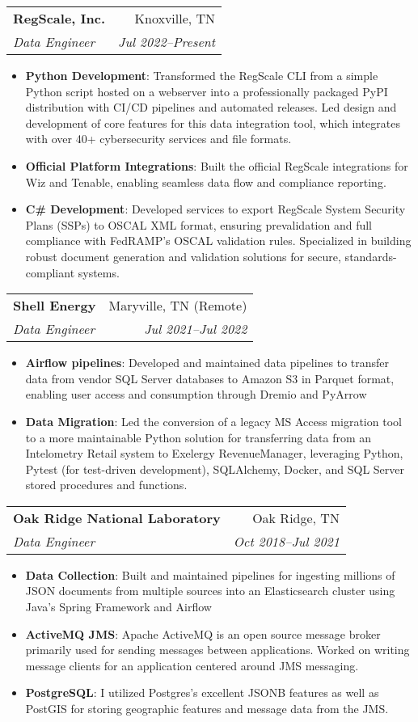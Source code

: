 \documentclass[letterpaper,11pt]{article}
\makeatletter
\newcommand{\resumeItem}[2]{
  \item\small{
    \textbf{#1}{: #2 \vspace{-2pt}}
  }
}
\newcommand{\resumeSubheading}[4]{
  \vspace{-1pt}\item
    \begin{tabular*}{0.97\textwidth}[t]{l@{\extracolsep{\fill}}r}
      \textbf{#1} & #2 \\
      \textit{\small#3} & \textit{\small #4} \\
    \end{tabular*}\vspace{-5pt}
}
\newcommand{\resumeItemListStart}{\begin{itemize}}
\newcommand{\resumeItemListEnd}{\end{itemize}\vspace{-5pt}}
\makeatother
\begin{document}
\resumeSubheading
	{RegScale, Inc.}{Knoxville, TN}
	{Data Engineer}{Jul 2022--Present}
	\resumeItemListStart
	\resumeItem{Python Development}
  {Transformed the RegScale CLI from a simple Python script hosted on a webserver into a professionally packaged PyPI distribution with CI/CD pipelines and automated releases. Led design and development of core features for this data integration tool, which integrates with over 40+ cybersecurity services and file formats.}
  \resumeItem{Official Platform Integrations}
	{Built the official RegScale integrations for Wiz and Tenable, enabling seamless data flow and compliance reporting.}
  \resumeItem{C\# Development}
	{Developed services to export RegScale System Security Plans (SSPs) to OSCAL XML format, ensuring prevalidation and full compliance with FedRAMP's OSCAL validation rules. Specialized in building robust document generation and validation solutions for secure, standards-compliant systems.}
	\resumeItemListEnd
    \resumeSubheading
      {Shell Energy}{Maryville, TN (Remote)}
      {Data Engineer}{Jul 2021--Jul 2022}
      \resumeItemListStart
        \resumeItem{Airflow pipelines}
          {Developed and maintained data pipelines to transfer data from vendor SQL Server databases to Amazon S3 in Parquet format, enabling user access and consumption through Dremio and PyArrow}
        \resumeItem{Data Migration}
          {Led the conversion of a legacy MS Access migration tool to a more maintainable Python solution for transferring data from an Intelometry Retail system to Exelergy RevenueManager, leveraging Python, Pytest (for test-driven development), SQLAlchemy, Docker, and SQL Server stored procedures and functions.}
      \resumeItemListEnd

    \resumeSubheading
      {Oak Ridge National Laboratory}{Oak Ridge, TN}
      {Data Engineer}{Oct 2018--Jul 2021}
      \resumeItemListStart
        \resumeItem{Data Collection}
          {Built and maintained pipelines for ingesting millions of JSON documents from multiple sources into an Elasticsearch cluster using Java's Spring Framework and Airflow}
        \resumeItem{ActiveMQ JMS}
          {Apache ActiveMQ is an open source message broker primarily used for sending messages between applications. Worked on writing message clients for an application centered around JMS messaging.}
        \resumeItem{PostgreSQL}
          {I utilized Postgres's excellent JSONB features as well as PostGIS for storing geographic features and message data from the JMS\@.}
      \resumeItemListEnd
\end{document}
